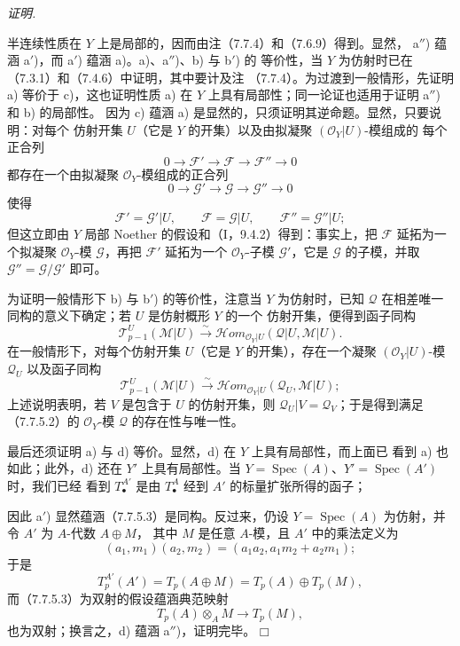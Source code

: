 \documentclass[UTF8,fontset=none,11pt,oneside,openany]{ctexbook}
\providecommand{\square}{\mdlgwhtsquare}
\newenvironment{proof}{%
  \par\smallskip\noindent\textit{证明.}\ %
}{\hfill$\square$\par}
\newcommand{\oldpage}[2][]{%
  \hypertarget{ega-source-page-#1-#2}{}%
  \marginnote{\scriptsize\textbf{#1}~|~#2}\ignorespaces}
\begin{document}
\begin{proof}
半连续性质在 $Y$ 上是局部的，因而由注（7.7.4）和（7.6.9）得到。显然，
a$''$) 蕴涵 a$'$)，而 a$'$) 蕴涵 a)。a)、a$''$)、b) 与 b$'$) 的
等价性，当 $Y$ 为仿射时已在（7.3.1）和（7.4.6）中证明，其中要计及注
（7.7.4）。为过渡到一般情形，先证明 a) 等价于 c)，这也证明性质 a)
在 $Y$ 上具有局部性；同一论证也适用于证明 a$''$) 和 b) 的局部性。
因为 c) 蕴涵 a) 是显然的，只须证明其逆命题。显然，只要说明：对每个
仿射开集 $U$（它是 $Y$ 的开集）以及由拟凝聚 $(\mathscr O_Y|U)$-模组成的
每个正合列
\[
  0\longrightarrow\mathscr F'
  \longrightarrow\mathscr F
  \longrightarrow\mathscr F''
  \longrightarrow0
\]
都存在一个由拟凝聚 $\mathscr O_Y$-模组成的正合列
\[
  0\longrightarrow\mathscr G'
  \longrightarrow\mathscr G
  \longrightarrow\mathscr G''
  \longrightarrow0
\]
使得
\[
  \mathscr F'=\mathscr G'|U,
  \qquad
  \mathscr F=\mathscr G|U,
  \qquad
  \mathscr F''=\mathscr G''|U;
\]
但这立即由 $Y$ 局部 Noether 的假设和（I，9.4.2）得到：事实上，把
$\mathscr F$ 延拓为一个拟凝聚 $\mathscr O_Y$-模 $\mathscr G$，再把
$\mathscr F'$ 延拓为一个 $\mathscr O_Y$-子模 $\mathscr G'$，它是
$\mathscr G$ 的子模，并取 $\mathscr G''=\mathscr G/\mathscr G'$ 即可。

为证明一般情形下 b) 与 b$'$) 的等价性，注意当 $Y$ 为仿射时，已知
$\mathscr Q$ 在相差唯一同构的意义下确定；若 $U$ 是仿射概形 $Y$ 的一个
仿射开集，便得到函子同构
\[
  \mathscr T_{p-1}^{U}(\mathscr M|U)
  \xrightarrow{\sim}
  \mathscr{H}\!om_{\mathscr O_Y|U}
    (\mathscr Q|U,\mathscr M|U).
\]
在一般情形下，对每个仿射开集 $U$（它是 $Y$ 的开集），存在一个凝聚
$(\mathscr O_Y|U)$-模 $\mathscr Q_U$ 以及函子同构
\[
  \mathscr T_{p-1}^{U}(\mathscr M|U)
  \xrightarrow{\sim}
  \mathscr{H}\!om_{\mathscr O_Y|U}
    (\mathscr Q_U,\mathscr M|U);
\]
上述说明表明，若 $V$ 是包含于 $U$ 的仿射开集，则
$\mathscr Q_U|V=\mathscr Q_V$；于是得到满足（7.7.5.2）的
$\mathscr O_Y$-模 $\mathscr Q$ 的存在性与唯一性。

最后还须证明 a) 与 d) 等价。显然，d) 在 $Y$ 上具有局部性，而上面已
看到 a) 也如此；此外，d) 还在 $Y'$ 上具有局部性。当
$Y=\operatorname{Spec}(A)$、$Y'=\operatorname{Spec}(A')$ 时，我们已经
看到 $T_\bullet^{A'}$ 是由 $T_\bullet^A$ 经到 $A'$ 的标量扩张所得的函子；

\oldpage[III]{201}
因此 a$'$) 显然蕴涵（7.7.5.3）是同构。反过来，仍设
$Y=\operatorname{Spec}(A)$ 为仿射，并令 $A'$ 为 $A$-代数 $A\oplus M$，
其中 $M$ 是任意 $A$-模，且 $A'$ 中的乘法定义为
\[
  (a_1,m_1)(a_2,m_2)
  =
  (a_1a_2,a_1m_2+a_2m_1);
\]
于是
\[
  T_p^{A'}(A')
  =
  T_p(A\oplus M)
  =
  T_p(A)\oplus T_p(M),
\]
而（7.7.5.3）为双射的假设蕴涵典范映射
\[
  T_p(A)\otimes_A M\longrightarrow T_p(M),
\]
也为双射；换言之，d) 蕴涵 a$''$)，证明完毕。
\end{proof}
\end{document}
